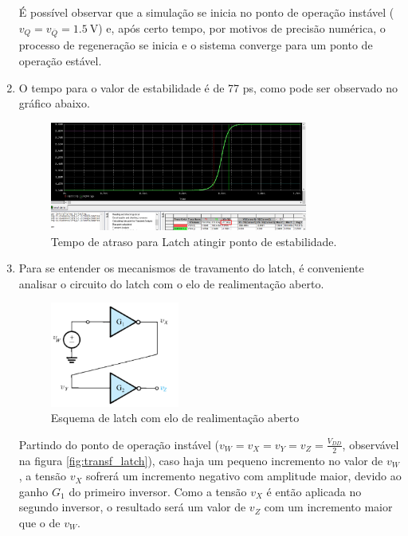 \documentclass[11pt]{article}
\begin{document}
\begin{enumerate}[label=\alph*)]
É possível observar que a simulação se inicia no ponto de operação instável ($v_Q = v_{\bar Q} = 1.5\ \text{V}$) e, após certo tempo, por motivos de precisão numérica, o processo de regeneração se inicia e o sistema converge para um ponto de operação estável.

\item O tempo para o valor de estabilidade é de 77 ps, como pode ser observado no gráfico abaixo.

\begin{figure}
    \centering
    \includegraphics[width=0.8\textwidth]{imgs/atraso_latch.png}
    \caption{Tempo de atraso para Latch atingir ponto de estabilidade.}
    \label{fig:atraso_latch}
\end{figure}

\item Para se entender os mecanismos de travamento do latch, é conveniente analisar o circuito do latch com o elo de realimentação aberto.

\begin{figure}
    \centering
    \includegraphics[width=0.4\textwidth]{imgs/latch_figura.png}
    \caption{Esquema de latch com elo de realimentação aberto}
    \label{fig:fig-latch}
\end{figure}

Partindo do ponto de operação instável ($v_W = v_X = v_Y = v_Z = \frac{V_{DD}}{2}$, observável na figura \ref{fig:transf_latch}), caso haja um pequeno incremento no valor de $v_W$, a tensão $v_X$ sofrerá um incremento negativo com amplitude maior, devido ao ganho $G_1$ do primeiro inversor. Como a tensão $v_X$ é então aplicada no segundo inversor, o resultado será um valor de $v_Z$ com um incremento maior que o de $v_W$.


\end{enumerate}
\end{document}

